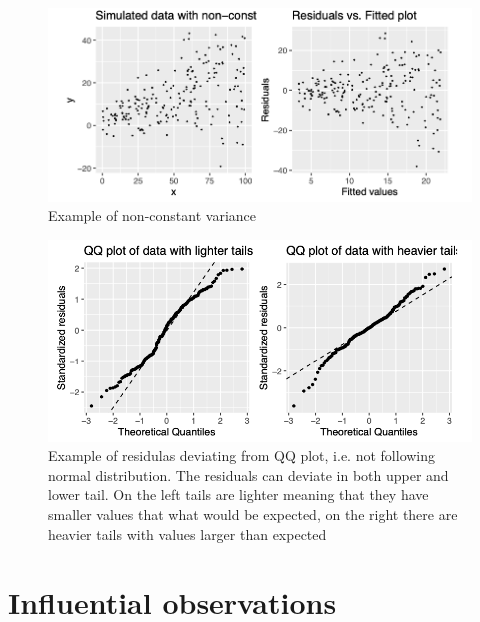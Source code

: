 \documentclass[
]{book}
\theoremstyle{definition}
\theoremstyle{definition}
\theoremstyle{definition}
\theoremstyle{remark}
\begin{document}
\begin{figure}

{\centering \includegraphics{figures/linear-models/lm-assumptions-02} 

}

\caption{Example of non-constant variance}\label{fig:lm-viol-02}
\end{figure}

\begin{figure}

{\centering \includegraphics{figures/linear-models/lm-assumptions-03} 

}

\caption{Example of residulas deviating from QQ plot, i.e. not following normal distribution. The residuals can deviate in both upper and lower tail. On the left tails are lighter meaning that they have smaller values that what would be expected, on the right there are heavier tails with values larger than expected}\label{fig:lm-viol-03}
\end{figure}

\hypertarget{influential-observations}{%
\section{Influential observations}\label{influential-observations}}
\end{document}
